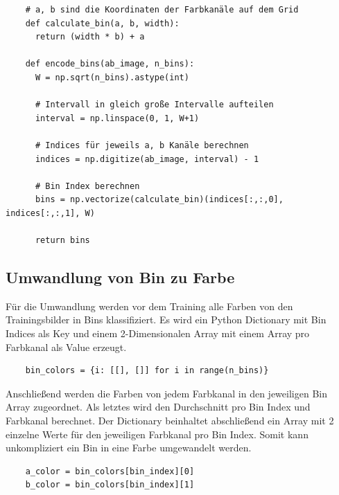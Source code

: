 \begin{listing}[H]
  \begin{verbatim}
    # a, b sind die Koordinaten der Farbkanäle auf dem Grid
    def calculate_bin(a, b, width):
      return (width * b) + a
  
    def encode_bins(ab_image, n_bins):
      W = np.sqrt(n_bins).astype(int)
  
      # Intervall in gleich große Intervalle aufteilen
      interval = np.linspace(0, 1, W+1)
  
      # Indices für jeweils a, b Kanäle berechnen
      indices = np.digitize(ab_image, interval) - 1
  
      # Bin Index berechnen
      bins = np.vectorize(calculate_bin)(indices[:,:,0], indices[:,:,1], W)
  
      return bins
  \end{verbatim}
\end{listing}

\subsection{Umwandlung von Bin zu Farbe}
Für die Umwandlung werden vor dem Training alle Farben von den Trainingsbilder in Bins klassifiziert. Es wird ein Python Dictionary mit Bin
Indices als Key und einem 2-Dimensionalen Array mit einem Array pro Farbkanal als Value erzeugt.

\begin{listing}[H]
  \begin{verbatim}
    bin_colors = {i: [[], []] for i in range(n_bins)}
  \end{verbatim}
\end{listing}

Anschließend werden die Farben von jedem Farbkanal in den jeweiligen Bin Array zugeordnet. Als letztes wird den Durchschnitt pro Bin Index
und Farbkanal berechnet. Der Dictionary beinhaltet abschließend ein Array mit 2 einzelne Werte für den jeweiligen Farbkanal pro Bin Index.
Somit kann unkompliziert ein Bin in eine Farbe umgewandelt werden.

\begin{listing}[H]
  \begin{verbatim}
    a_color = bin_colors[bin_index][0]
    b_color = bin_colors[bin_index][1]
  \end{verbatim}
\end{listing}

